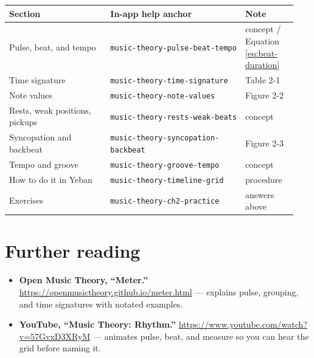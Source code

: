 \begin{center}
\footnotesize
\setlength{\tabcolsep}{3pt}
\begin{longtable}{p{0.33\linewidth}p{0.44\linewidth}p{0.17\linewidth}}
\toprule
Section & In-app help anchor & Note \\
\midrule
\endhead
Pulse, beat, and tempo & \texttt{music-theory-pulse-beat-tempo} & concept / Equation \eqref{eq:beat-duration} \\
Time signature & \texttt{music-theory-time-signature} & Table 2-1 \\
Note values & \texttt{music-theory-note-values} & Figure 2-2 \\
Rests, weak positions, pickups & \texttt{music-theory-rests-weak-beats} & concept \\
Syncopation and backbeat & \texttt{music-theory-syncopation-backbeat} & Figure 2-3 \\
Tempo and groove & \texttt{music-theory-groove-tempo} & concept \\
How to do it in Yeban & \texttt{music-theory-timeline-grid} & procedure \\
Exercises & \texttt{music-theory-ch2-practice} & answers above \\
\bottomrule
\end{longtable}
\end{center}

\section*{Further reading}
\begin{itemize}
  \item \textbf{Open Music Theory, “Meter.”} \url{https://openmusictheory.github.io/meter.html} — explains pulse, grouping, and time signatures with notated examples.
  \item \textbf{YouTube, “Music Theory: Rhythm.”} \url{https://www.youtube.com/watch?v=57GvxD3XRyM} — animates pulse, beat, and measure so you can hear the grid before naming it.
\end{itemize}


